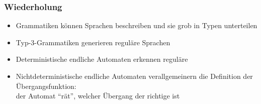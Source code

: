 \documentclass[onlymath,handout]{beamer}
\begin{document}
% 
% 

\maketitle


\begin{frame}\frametitle{Wiederholung}

\begin{itemize}
\item Grammatiken können Sprachen beschreiben und sie grob in Typen unterteilen
\item Typ-3-Grammatiken \alert{generieren} reguläre Sprachen
\item Deterministische endliche Automaten \alert{erkennen} reguläre 
\item Nichtdeterministische endliche Automaten verallgemeinern die Definition der Übergangsfunktion:\\ der Automat "`rät"', welcher Übergang der richtige ist
\end{itemize}

\end{frame}
\end{document}
